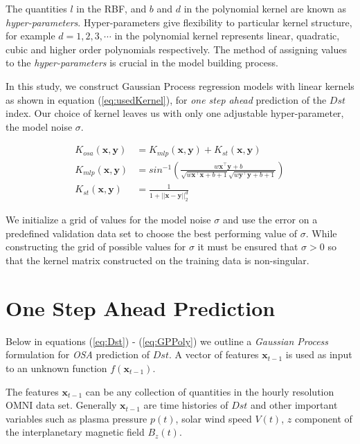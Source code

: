 \documentclass[draft,sw]{AGUTeX}
\begin{document}
\begin{article}
The quantities $l$ in the RBF, and $b$ and $d$ in the polynomial kernel are known as \emph{hyper-parameters}. Hyper-parameters give flexibility to particular kernel structure, for example $d = 1, 2, 3, \cdots$ in the polynomial kernel represents linear, quadratic, cubic and higher order polynomials respectively. The method of assigning values to the \emph{hyper-parameters} is crucial in the model building process. 

In this study, we construct Gaussian Process regression models with linear kernels as shown in equation (\ref{eq:usedKernel}), for \emph{one step ahead} prediction of the $Dst$ index. Our choice of kernel leaves us with only one adjustable hyper-parameter, the model noise $\sigma$. 

\begin{align}
    K_{osa}(\mathbf{x}, \mathbf{y}) & = K_{mlp}(\mathbf{x}, \mathbf{y}) + K_{st}(\mathbf{x}, \mathbf{y}) \label{eq:usedKernel} \\
    K_{mlp}(\mathbf{x}, \mathbf{y}) & = sin^{-1}(\frac{w\mathbf{x}^\intercal \mathbf{y} + b}{\sqrt{w\mathbf{x}^\intercal \mathbf{x} + b + 1} \sqrt{w\mathbf{y}^\intercal \mathbf{y} + b + 1}}) \\
    K_{st}(\mathbf{x}, \mathbf{y}) & = \frac{1}{1 + ||\mathbf{x} - \mathbf{y}||_{2}^d}
\end{align}

We initialize a grid of values for the model noise $\sigma$ and use the error on a predefined validation data set to choose the best performing value of $\sigma$. While constructing the grid of possible values for $\sigma$ it must be ensured that $\sigma > 0$ so that the kernel matrix constructed on the training data is non-singular.

\section{One Step Ahead Prediction} \label{sec:osa}

Below in equations (\ref{eq:Dst}) - (\ref{eq:GPPoly}) we outline a \emph{Gaussian Process} formulation for \emph{OSA} prediction of $Dst$. A vector of features $\mathbf{x}_{t-1}$ is used as input to an unknown function $f(\mathbf{x}_{t-1})$.

The features $\mathbf{x}_{t-1}$ can be any collection of quantities in the hourly resolution OMNI data set. Generally $\mathbf{x}_{t-1}$ are time histories of $Dst$ and other important variables such as plasma pressure $p(t)$, solar wind speed $V(t)$, $z$ component of the interplanetary magnetic field $B_z(t)$.


\end{article}
\end{document}
